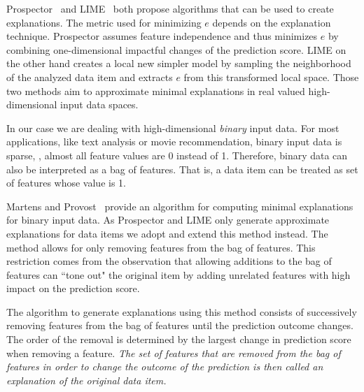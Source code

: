Prospector~\cite{prospector} and LIME~\cite{DBLP:journals/corr/RibeiroSG16} both propose algorithms that can be used to create explanations. The metric used for minimizing $e$ depends on the explanation technique. Prospector assumes feature independence and thus minimizes $e$ by combining one-dimensional impactful changes of the prediction score. LIME on the other hand creates a local new simpler model by sampling the neighborhood of the analyzed data item and extracts $e$ from this transformed local space. Those two methods aim to approximate minimal explanations in real valued high-dimensional input data spaces.

In our case we are dealing with high-dimensional \textit{binary} input data.
For most applications, like text analysis or movie recommendation, binary input data is sparse, \ie, almost all feature values are 0 instead of 1. Therefore, binary data can also be interpreted as a bag of features. That is, a data item can be treated as set of features whose value is 1.

Martens and Provost~\cite{Martens:2014:EDD:2600518.2600523} provide an algorithm for computing minimal explanations for binary input data.
As Prospector and LIME only generate approximate explanations for data items we adopt and extend this method instead.
The method allows for only removing features from the bag of features.
This restriction comes from the observation that allowing additions to the bag of features can ``tone out" the original item by adding unrelated features with high impact on the prediction score.


The algorithm to generate explanations using this method consists of successively removing features from the bag of features until the prediction outcome changes. The order of the removal is determined by the largest change in prediction score when removing a feature. \textit{The set of features that are removed from the bag of features in order to change the outcome of the prediction is then called an explanation of the original data item.}

